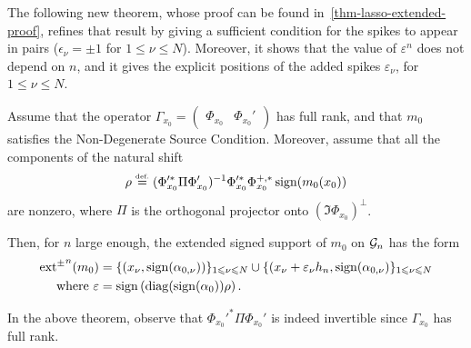 The following new theorem, whose proof can be found in~\ref{thm-lasso-extended-proof}, refines that result by giving a sufficient condition for the spikes to appear in pairs (\ie $\epsilon_\nu=\pm 1$ for $1\leq \nu\leq N$). Moreover, it shows that the value of $\varepsilon^n$ does not depend on $n$, and it gives the explicit positions of the added spikes $\varepsilon_\nu$, for $1\leq \nu\leq N$.

\begin{thm}\label{thm-lasso-extended}
  Assume that the  operator $\Gamma_{x_0}=\begin{pmatrix}
  \Phi_{x_0} & \Phi_{x_0}'
\end{pmatrix}$ has full rank, and that $m_0$ satisfies the Non-Degenerate Source Condition. Moreover, assume that all the components of the natural shift
\begin{align}\label{eq-dfn-rho}
\rho\stackrel{\mbox{\upshape\tiny def.}}{=}  (\Phi_{x_0}'^*\Pi\Phi_{x_0}')^{-1}\Phi_{x_0}'^*\Phi_{x_0}^{+,*}\operatorname{sign}(m_0(x_0))
\end{align}
 are nonzero, where $\Pi$ is the orthogonal projector onto $(\Im \Phi_{x_0})^\perp$. 

Then, for $n$ large enough, the extended signed support of $m_0$ on $\mathcal{G}_n$ has the form 
\begin{align}
  \operatorname{ext^{\pm}}^n(m_0)&= \{(x_\nu, \operatorname{sign}(\alpha_{0,\nu}))\}_{1\leqslant \nu\leqslant N}\cup \{(x_\nu+\varepsilon_\nu {h_n}, \operatorname{sign}(\alpha_{0,\nu})\}_{1\leqslant \nu \leqslant N}   \\
  \mbox{where } \varepsilon &= \operatorname{sign}\left(\operatorname{diag}(\operatorname{sign}(\alpha_0))\rho\right).
\end{align}
\end{thm}

In the above theorem, observe that $\Phi_{x_0}'^*\Pi\Phi_{x_0}'$ is indeed invertible since $\Gamma_{x_0}$ has full rank.

